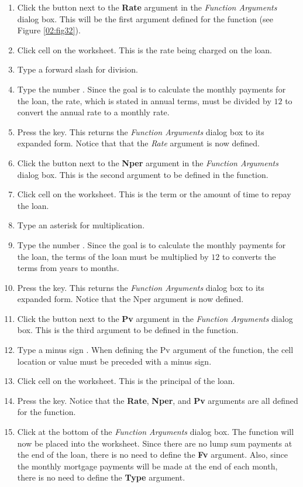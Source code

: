 \begin{enumbox}
	\begin{enumerate}
		\item Click the  button next to the \textbf{Rate} argument in the \textit{Function Arguments} dialog box. This will be the first argument defined for the function (see Figure \ref{02:fig32}).
		\item Click cell  on the worksheet. This is the rate being charged on the loan.
		\item Type a forward slash \fmtTyping{/} for division.
		\item Type the number . Since the goal is to calculate the monthly payments for the loan, the rate, which is stated in annual terms, must be divided by $ 12 $ to convert the annual rate to a monthly rate.
		\item Press the  key. This returns the \textit{Function Arguments} dialog box to its expanded form. Notice that that the \textit{Rate} argument is now defined.
		\item Click the  button next to the \textbf{Nper} argument in the \textit{Function Arguments} dialog box. This is the second argument to be defined in the function.
		\item Click cell  on the worksheet. This is the term or the amount of time to repay the loan.
		\item Type an asterisk \fmtTyping{*} for multiplication.
		\item Type the number . Since the goal is to calculate the monthly payments for the loan, the terms of the loan must be multiplied by $ 12 $ to converts the terms from years to months.
		\item Press the  key. This returns the \textit{Function Arguments} dialog box to its expanded form. Notice that the Nper argument is now defined.
		\item Click the  button next to the \textbf{Pv} argument in the \textit{Function Arguments} dialog box. This is the third argument to be defined in the function.
		\item Type a minus sign \fmtTyping{-}. When defining the Pv argument of the  function, the cell location or value must be preceded with a minus sign.
		\item Click cell  on the worksheet. This is the principal of the loan.
		\item Press the  key. Notice that the \textbf{Rate}, \textbf{Nper}, and \textbf{Pv} arguments are all defined for the function.
		\item Click  at the bottom of the \textit{Function Arguments} dialog box. The function will now be placed into the worksheet. Since there are no lump sum payments at the end of the loan, there is no need to define the \textbf{Fv} argument. Also, since the monthly mortgage payments will be made at the end of each month, there is no need to define the \textbf{Type} argument.
	\end{enumerate}
\end{enumbox}

